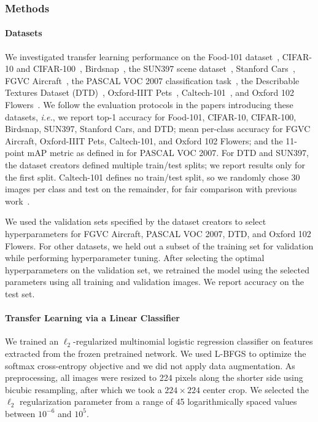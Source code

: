 \documentclass{article}
\begin{document}
\subsubsection{Methods}

\paragraph{Datasets} We investigated transfer learning performance on the Food-101 dataset~\cite{bossard2014food}, CIFAR-10 and CIFAR-100~\cite{krizhevsky2009learning}, Birdsnap~\cite{berg2014birdsnap}, the SUN397 scene dataset~\cite{xiao2010sun}, Stanford Cars~\cite{krause2013collecting}, FGVC Aircraft~\cite{maji13fine-grained}, the PASCAL VOC 2007 classification task~\cite{everingham2010pascal}, the Describable Textures Dataset (DTD)~\cite{cimpoi2014describing}, Oxford-IIIT Pets~\cite{parkhi2012cats}, Caltech-101~\cite{fei2004learning}, and Oxford 102 Flowers~\cite{nilsback2008automated}. We follow the evaluation protocols in the papers introducing these datasets, \textit{i.e.}, we report top-1 accuracy for Food-101, CIFAR-10, CIFAR-100, Birdsnap, SUN397, Stanford Cars, and DTD; mean per-class accuracy for FGVC Aircraft, Oxford-IIIT Pets, Caltech-101, and Oxford 102 Flowers; and the 11-point mAP metric as defined in \citet{everingham2010pascal} for PASCAL VOC 2007. For DTD and SUN397, the dataset creators defined multiple train/test splits; we report results only for the first split. Caltech-101 defines no train/test split, so we randomly chose 30 images per class and test on the remainder, for fair comparison with previous work~\cite{donahue2014decaf,simonyan2014very}.

We used the validation sets specified by the dataset creators to select hyperparameters for FGVC Aircraft, PASCAL VOC 2007, DTD, and Oxford 102 Flowers. For other datasets, we held out a subset of the training set for validation while performing hyperparameter tuning. After selecting the optimal hyperparameters on the validation set, we retrained the model using the selected parameters using all training and validation images. We report accuracy on the test set.

\paragraph{Transfer Learning via a Linear Classifier} We trained an $\ell_2$-regularized multinomial logistic regression classifier on features extracted from the frozen pretrained network. We used L-BFGS to optimize the softmax cross-entropy objective and we did not apply data augmentation. As preprocessing, all images were resized to 224 pixels along the shorter side using bicubic resampling, after which we took a $224\times 224$ center crop. We selected the $\ell_2$ regularization parameter from a range of 45 logarithmically spaced values between $10^{-6}$ and $10^5$.
\end{document}
